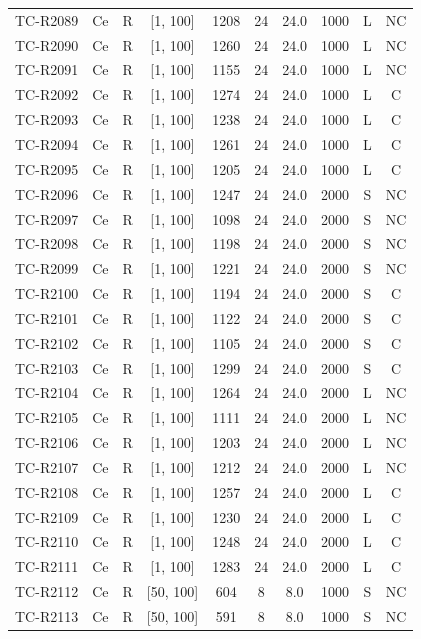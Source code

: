 \begin{longtable}{lccccccccc}
TC-R2089 & Ce & R & [1, 100] & 1208 & 24 & 24.0 & 1000 & L & NC \\
TC-R2090 & Ce & R & [1, 100] & 1260 & 24 & 24.0 & 1000 & L & NC \\
TC-R2091 & Ce & R & [1, 100] & 1155 & 24 & 24.0 & 1000 & L & NC \\
TC-R2092 & Ce & R & [1, 100] & 1274 & 24 & 24.0 & 1000 & L & C \\
TC-R2093 & Ce & R & [1, 100] & 1238 & 24 & 24.0 & 1000 & L & C \\
TC-R2094 & Ce & R & [1, 100] & 1261 & 24 & 24.0 & 1000 & L & C \\
TC-R2095 & Ce & R & [1, 100] & 1205 & 24 & 24.0 & 1000 & L & C \\
TC-R2096 & Ce & R & [1, 100] & 1247 & 24 & 24.0 & 2000 & S & NC \\
TC-R2097 & Ce & R & [1, 100] & 1098 & 24 & 24.0 & 2000 & S & NC \\
TC-R2098 & Ce & R & [1, 100] & 1198 & 24 & 24.0 & 2000 & S & NC \\
TC-R2099 & Ce & R & [1, 100] & 1221 & 24 & 24.0 & 2000 & S & NC \\
TC-R2100 & Ce & R & [1, 100] & 1194 & 24 & 24.0 & 2000 & S & C \\
TC-R2101 & Ce & R & [1, 100] & 1122 & 24 & 24.0 & 2000 & S & C \\
TC-R2102 & Ce & R & [1, 100] & 1105 & 24 & 24.0 & 2000 & S & C \\
TC-R2103 & Ce & R & [1, 100] & 1299 & 24 & 24.0 & 2000 & S & C \\
TC-R2104 & Ce & R & [1, 100] & 1264 & 24 & 24.0 & 2000 & L & NC \\
TC-R2105 & Ce & R & [1, 100] & 1111 & 24 & 24.0 & 2000 & L & NC \\
TC-R2106 & Ce & R & [1, 100] & 1203 & 24 & 24.0 & 2000 & L & NC \\
TC-R2107 & Ce & R & [1, 100] & 1212 & 24 & 24.0 & 2000 & L & NC \\
TC-R2108 & Ce & R & [1, 100] & 1257 & 24 & 24.0 & 2000 & L & C \\
TC-R2109 & Ce & R & [1, 100] & 1230 & 24 & 24.0 & 2000 & L & C \\
TC-R2110 & Ce & R & [1, 100] & 1248 & 24 & 24.0 & 2000 & L & C \\
TC-R2111 & Ce & R & [1, 100] & 1283 & 24 & 24.0 & 2000 & L & C \\
TC-R2112 & Ce & R & [50, 100] & 604 & 8 & 8.0 & 1000 & S & NC \\
TC-R2113 & Ce & R & [50, 100] & 591 & 8 & 8.0 & 1000 & S & NC \\

\end{longtable}
